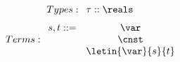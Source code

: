 \[
Types:
\begin{array}{c}
    \tau :: \reals
\end{array}
\]
\[
Terms:
\begin{array}{cc}
    s,t::= 
    & \var \\
    & \cnst \\
    & \letin{\var}{s}{t}
\end{array}    
\]